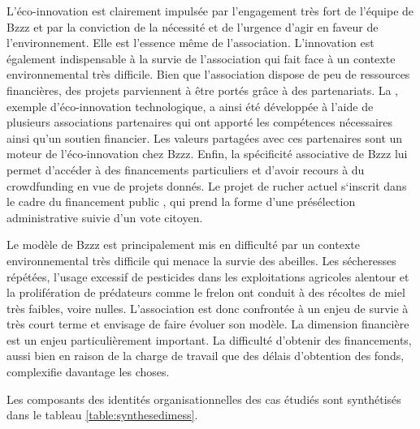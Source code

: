         L’éco-innovation est clairement impulsée par l’engagement très fort de l’équipe de Bzzz et par la conviction de la nécessité et de l’urgence d’agir en faveur de l’environnement. Elle est l’essence même de l’association. L’innovation est également indispensable à la survie de l’association qui fait face à un contexte environnemental très difficile. Bien que l’association dispose de peu de ressources financières, des projets parviennent à être portés grâce à des partenariats. La , exemple d’éco-innovation technologique, a ainsi été développée à l’aide de plusieurs associations partenaires qui ont apporté les compétences nécessaires ainsi qu’un soutien financier. Les valeurs partagées avec ces partenaires sont un moteur de l’éco-innovation chez Bzzz. Enfin, la spécificité associative de Bzzz lui permet d’accéder à des financements particuliers et d’avoir recours à du crowdfunding en vue de projets donnés. Le projet de rucher actuel s‘inscrit dans le cadre du financement public , qui prend la forme d’une présélection administrative suivie d’un vote citoyen.

        Le modèle de Bzzz est principalement mis en difficulté par un contexte environnemental très difficile qui menace la survie des abeilles. Les sécheresses répétées, l’usage excessif de pesticides dans les exploitations agricoles alentour et la prolifération de prédateurs comme le frelon ont conduit à des récoltes de miel très faibles, voire nulles. L’association est donc confrontée à un enjeu de survie à très court terme et envisage de faire évoluer son modèle. La dimension financière est un enjeu particulièrement important. La difficulté d’obtenir des financements, aussi bien en raison de la charge de travail que des délais d’obtention des fonds, complexifie davantage les choses.

    \transition
    
    Les composants des identités organisationnelles des cas étudiés sont synthétisés dans le tableau \ref{table:synthesedimess}.

